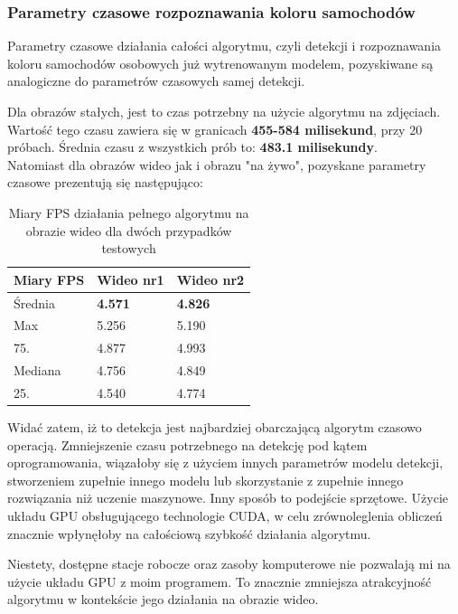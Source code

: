
\pagebreak

\subsubsection{Parametry czasowe rozpoznawania koloru samochodów}

Parametry czasowe działania całości algorytmu, czyli detekcji i rozpoznawania koloru samochodów osobowych już wytrenowanym modelem, pozyskiwane są analogiczne do parametrów czasowych samej detekcji.

Dla obrazów stałych, jest to czas potrzebny na użycie algorytmu na zdjęciach. Wartość tego czasu zawiera się w granicach \textbf{455-584 milisekund}, przy 20 próbach. Średnia czasu z wszystkich prób to: \textbf{483.1 milisekundy}.\\

Natomiast dla obrazów wideo jak i obrazu "\null{}na żywo", pozyskane parametry czasowe prezentują się następująco:

\begin{table}[h!]
\begin{center}
\begin{tabular}{|l|l|l|}
\hline
\multicolumn{1}{|c|}{Miary FPS} & Wideo nr1 & Wideo nr2 \\ \hline
Średnia                         & \textbf{4.571}     & \textbf{4.826}     \\ \hline
Max                             & 5.256     & 5.190     \\ \hline
75.                             & 4.877     & 4.993     \\ \hline
Mediana                         & 4.756     & 4.849     \\ \hline
25.                             & 4.540     & 4.774     \\ \hline
\end{tabular}%
\caption{Miary FPS działania pełnego algorytmu na obrazie wideo dla dwóch przypadków testowych}
\label{tab:fps_recog}
\end{center}
\end{table}

Widać zatem, iż to detekcja jest najbardziej obarczającą algorytm czasowo operacją. Zmniejszenie czasu potrzebnego na detekcję pod kątem oprogramowania, wiązałoby się z użyciem innych parametrów modelu detekcji, stworzeniem zupełnie innego modelu lub skorzystanie z zupełnie innego rozwiązania niż uczenie maszynowe. Inny sposób to podejście sprzętowe. Użycie układu GPU obsługującego technologie CUDA, w celu zrównoleglenia obliczeń znacznie wpłynęłoby na całościową szybkość działania algorytmu. 

Niestety, dostępne stacje robocze oraz zasoby komputerowe nie pozwalają mi na użycie układu GPU z moim programem. To znacznie zmniejsza atrakcyjność algorytmu w kontekście jego działania na obrazie wideo.